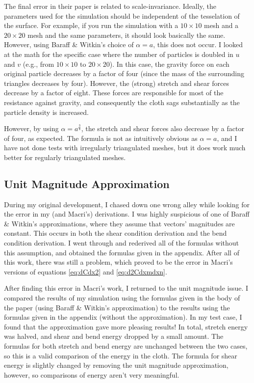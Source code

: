 \documentclass[twocolumn]{article}
\begin{document}
The final error in their paper is related to scale-invariance. Ideally, the
parameters used for the simulation should be independent of the tesselation of
the surface. For example, if you run the simulation with a $10\times10$
mesh and a $20\times20$ mesh and the same parameters, it should look
basically the same. However, using Baraff \& Witkin's choice of $\alpha=a$,
this does not occur. I looked at the math for the specific case where the
number of particles is doubled in $u$ and $v$ (e.g., from $10\times10$ to
$20\times20$). In this case, the gravity force on each original particle
decreases by a factor of four (since the mass of the surrounding triangles
decreases by four). However, the (strong) stretch and shear forces decrease by
a factor of eight. These forces are responsible for most of the resistance
against gravity, and consequently the cloth sags substantially as the particle
density is increased.

However, by using $\alpha=a^\frac{3}{4}$, the stretch and shear forces also
decrease by a factor of four, as expected. The formula is not as intuitively
obvious as $\alpha=a$, and I have not done tests with irregularly triangulated
meshes, but it does work much better for regularly triangulated meshes.

\subsection{Unit Magnitude Approximation}

During my original development, I chased down one wrong alley while looking for
the error in my (and Macri's) derivations. I was highly suspicious of one
of Baraff \& Witkin's approximations, where they assume that vectors'
magnitudes are constant. This occurs in both the shear condition derivation and
the bend condition derivation. I went through and rederived all of the formulas
without this assumption, and obtained the formulas given in the appendix.
After all of this work, there was still a problem, which proved to be the
error in Macri's versions of equations \eqref{eq:dCdx2} and \eqref{eq:d2Cdxmdxn}.

After finding this error in Macri's work, I returned to the unit magnitude
issue. I compared the results of my simulation using the formulas given in
the body of the paper (using Baraff \& Witkin's approximation) to the results
using the formulas given in the appendix (without the approximation). In my
test case, I found that the approximation gave more pleasing results! In total,
stretch energy was halved, and shear and bend energy dropped by a small amount.
The formulas for both stretch and bend energy are unchanged between the two
cases, so this is a valid comparison of the energy in the cloth. The formula
for shear energy is slightly changed by removing the unit magnitude
approximation, however, so comparisons of energy aren't very meaningful.
\end{document}
